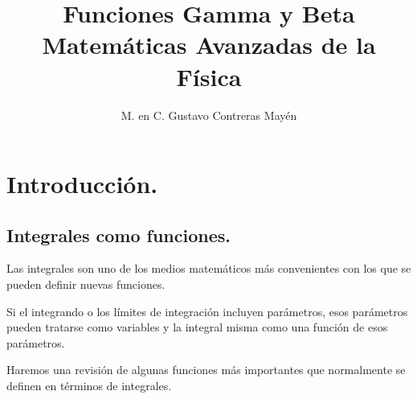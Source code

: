 
\usepackage{apacite}
\title{Funciones Gamma y Beta \\[0.3em]  \large{Matemáticas Avanzadas de la Física}\vspace{-3ex}}
\author{M. en C. Gustavo Contreras Mayén}
\date{ }

\vspace{-4cm}
\maketitle
\fontsize{14}{14}\selectfont
\tableofcontents
\newpage
\section{Introducción.}
\subsection{Integrales como funciones.}
Las integrales son uno de los medios matemáticos más convenientes con los que se pueden definir nuevas funciones.
\par
Si el integrando o los límites de integración incluyen parámetros, esos parámetros pueden tratarse como variables y la integral misma como una función de esos parámetros.
\par
Haremos una revisión de algunas funciones más importantes que normalmente se definen en términos de integrales.
